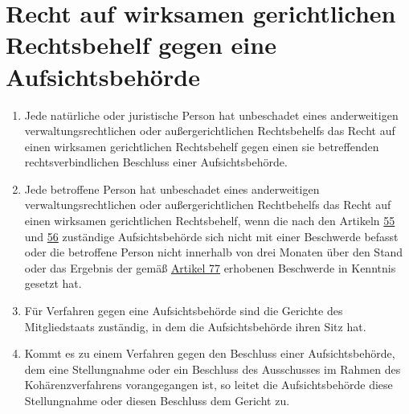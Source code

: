 \chapter{Recht auf wirksamen gerichtlichen Rechtsbehelf gegen eine Aufsichtsbehörde}
\label{ch:78}


\begin{enumerate}

  \item Jede natürliche oder juristische Person hat unbeschadet eines anderweitigen verwaltungsrechtlichen oder
   außergerichtlichen Rechtsbehelfs das Recht auf einen wirksamen gerichtlichen Rechtsbehelf gegen einen sie
   betreffenden rechtsverbindlichen Beschluss einer Aufsichtsbehörde.
  \label{itm:78-1}

  \item Jede betroffene Person hat unbeschadet eines anderweitigen verwaltungsrechtlichen oder außergerichtlichen
   Rechtbehelfs das Recht auf einen wirksamen gerichtlichen Rechtsbehelf, wenn die nach den Artikeln \hyperref[ch:55]
   {55} und \hyperref[ch:56]{56} zuständige Aufsichtsbehörde sich nicht mit einer Beschwerde befasst oder die
   betroffene Person nicht innerhalb von drei Monaten über den Stand oder das Ergebnis der gemäß \hyperref[ch:77]
   {Artikel 77} erhobenen Beschwerde in Kenntnis gesetzt hat.
  \label{itm:78-2}

  \item Für Verfahren gegen eine Aufsichtsbehörde sind die Gerichte des Mitgliedstaats zuständig, in dem die
   Aufsichtsbehörde ihren Sitz hat.
  \label{itm:78-3}

  \item Kommt es zu einem Verfahren gegen den Beschluss einer Aufsichtsbehörde, dem eine Stellungnahme oder ein
   Beschluss des Ausschusses im Rahmen des Kohärenzverfahrens vorangegangen ist, so leitet die Aufsichtsbehörde diese
   Stellungnahme oder diesen Beschluss dem Gericht zu.
  \label{itm:78-4}

\end{enumerate}


